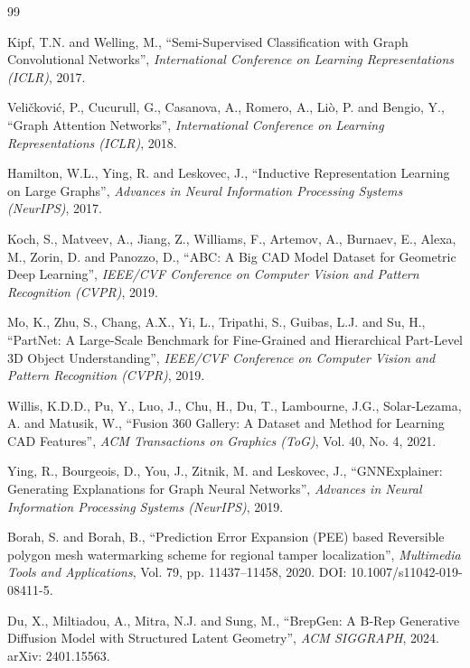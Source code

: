 \documentclass[12pt]{report}
\begin{document}
\newpage

\begin{thebibliography}{99}

Kipf, T.N. and Welling, M., ``Semi-Supervised Classification with Graph Convolutional Networks'', \textit{International Conference on Learning Representations (ICLR)}, 2017.

Veli\v{c}kovi\'{c}, P., Cucurull, G., Casanova, A., Romero, A., Li\`{o}, P. and Bengio, Y., ``Graph Attention Networks'', \textit{International Conference on Learning Representations (ICLR)}, 2018.

Hamilton, W.L., Ying, R. and Leskovec, J., ``Inductive Representation Learning on Large Graphs'', \textit{Advances in Neural Information Processing Systems (NeurIPS)}, 2017.

Koch, S., Matveev, A., Jiang, Z., Williams, F., Artemov, A., Burnaev, E., Alexa, M., Zorin, D. and Panozzo, D., ``ABC: A Big CAD Model Dataset for Geometric Deep Learning'', \textit{IEEE/CVF Conference on Computer Vision and Pattern Recognition (CVPR)}, 2019.

Mo, K., Zhu, S., Chang, A.X., Yi, L., Tripathi, S., Guibas, L.J. and Su, H., ``PartNet: A Large-Scale Benchmark for Fine-Grained and Hierarchical Part-Level 3D Object Understanding'', \textit{IEEE/CVF Conference on Computer Vision and Pattern Recognition (CVPR)}, 2019.

Willis, K.D.D., Pu, Y., Luo, J., Chu, H., Du, T., Lambourne, J.G., Solar-Lezama, A. and Matusik, W., ``Fusion 360 Gallery: A Dataset and Method for Learning CAD Features'', \textit{ACM Transactions on Graphics (ToG)}, Vol. 40, No. 4, 2021.

Ying, R., Bourgeois, D., You, J., Zitnik, M. and Leskovec, J., ``GNNExplainer: Generating Explanations for Graph Neural Networks'', \textit{Advances in Neural Information Processing Systems (NeurIPS)}, 2019.

Borah, S. and Borah, B., ``Prediction Error Expansion (PEE) based Reversible polygon mesh watermarking scheme for regional tamper localization'', \textit{Multimedia Tools and Applications}, Vol. 79, pp. 11437--11458, 2020. DOI: 10.1007/s11042-019-08411-5.

Du, X., Miltiadou, A., Mitra, N.J. and Sung, M., ``BrepGen: A B-Rep Generative Diffusion Model with Structured Latent Geometry'', \textit{ACM SIGGRAPH}, 2024. arXiv: 2401.15563.


\end{thebibliography}
\end{document}
